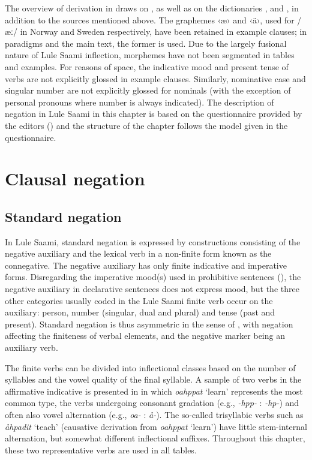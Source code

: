 \documentclass[output=paper,colorlinks,citecolor=brown]{langscibook}
\begin{document}
The overview of derivation in   draws on \citet{Kintel1991}, as well as on the dictionaries \citet{Spiik1994}, \citet{Korhonen2005} and \citet{Kintel2012}, in addition to the sources mentioned above. The graphemes ‹æ› and ‹ä›, used for /æː/ in Norway and Sweden respectively, have been retained in example clauses; in paradigms and the main text, the former is used.
Due to the largely fusional nature of Lule Saami inflection, morphemes have not been segmented in tables and examples. For reasons of space, the indicative mood and present tense of verbs are not explicitly glossed in example clauses. Similarly, nominative case and singular number are not explicitly glossed for nominals (with the exception of personal pronouns where number is always indicated). The description of negation in Lule Saami in this chapter is based on the questionnaire provided by the editors () and the structure of the chapter follows the model given in the questionnaire.

\section{Clausal negation} \label{sec:lul:2}
\subsection{Standard negation} \label{sec:lul:2.1}

In Lule Saami, standard negation is expressed by constructions consisting of the negative auxiliary and the lexical verb in a non-finite form known as the connegative. The negative auxiliary has only finite indicative and imperative forms. Disregarding the imperative mood(s) used in prohibitive sentences (), the negative auxiliary in declarative sentences does not express mood, but the three other categories usually coded in the Lule Saami finite verb occur on the auxiliary: person, number (singular, dual and plural) and tense (past and present). Standard negation is thus asymmetric in the sense of \citet{Miestamo2005}, with negation affecting the finiteness of verbal elements, and the negative marker being an auxiliary verb.

The finite verbs can be divided into inflectional classes based on the number of syllables and the vowel quality of the final syllable. A sample of two verbs in the affirmative indicative is presented in  
in which \textit{oahppat} ‘learn’ represents the most common type, the verbs undergoing consonant gradation (e.g., \textit{{}-hpp{}-} : \textit{{}-hp{}-}) and often also vowel alternation (e.g., \textit{oa{}-} : \textit{å{}-}). The so-called trisyllabic verbs such as \textit{åhpadit} ‘teach’ (causative derivation from \textit{oahppat} ‘learn’) have little stem-internal alternation, but somewhat different inflectional suffixes. Throughout this chapter, these two representative verbs are used in all tables.
\end{document}
